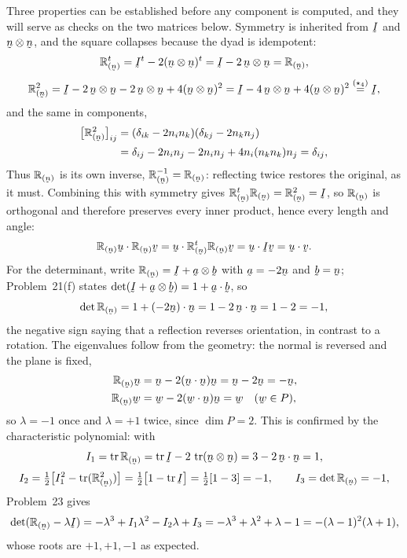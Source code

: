 \begin{solution}
Three properties can be established before any component is computed, and
they will serve as checks on the two matrices below. Symmetry is inherited
from $\I$ and $\bn\otimes\bn$, and the square collapses because the dyad is
idempotent:
\[
   \Refl{\bn}^{t}=\I^{t}-2(\bn\otimes\bn)^{t}=\I-2\,\bn\otimes\bn
   =\Refl{\bn},
\]
\[
   \Refl{\bn}^{2}=\I-2\,\bn\otimes\bn-2\,\bn\otimes\bn
   +4(\bn\otimes\bn)^{2}
   =\I-4\,\bn\otimes\bn+4(\bn\otimes\bn)^{2}
   \overset{(\star_4)}{=}\I,
\]
and the same in components,
\[
\begin{aligned}
   \big[\Refl{\bn}^{2}\big]_{ij}&=(\dd_{ik}-2n_in_k)(\dd_{kj}-2n_kn_j)\\
   &=\dd_{ij}-2n_in_j-2n_in_j+4n_i(n_kn_k)n_j=\dd_{ij},
\end{aligned}
\]
Thus $\Refl{\bn}$ is its own inverse, $\Refl{\bn}^{-1}=\Refl{\bn}$:
reflecting twice restores the original, as it must. Combining this with
symmetry gives $\Refl{\bn}^{t}\Refl{\bn}=\Refl{\bn}^{2}=\I$, so
$\Refl{\bn}$ is orthogonal and therefore preserves every inner product,
hence every length and angle:
\[
   \ip{\Refl{\bn}\bu}{\Refl{\bn}\bv}
   =\ip\bu{\Refl{\bn}^{t}\Refl{\bn}\bv}=\ip\bu{\I\bv}=\ip\bu\bv .
\]
For the determinant, write $\Refl{\bn}=\I+\ba\otimes\bb$ with $\ba=-2\bn$
and $\bb=\bn$; Problem~21(f) states $\det(\I+\ba\otimes\bb)=1+\ip\ba\bb$, so
\[
   \det\Refl{\bn}=1+\ip{(-2\bn)}{\bn}=1-2\,\ip\bn\bn=1-2=-1 ,
\]
the negative sign saying that a reflection reverses orientation, in contrast
to a rotation. The eigenvalues follow from the geometry: the normal is
reversed and the plane is fixed,
\[
\begin{aligned}
   \Refl{\bn}\bn&=\bn-2(\ip\bn\bn)\bn=\bn-2\bn=-\bn,\\
   \Refl{\bn}\bw&=\bw-2(\ip\bw\bn)\bn=\bw \quad (\bw\in P),
\end{aligned}
\]
so $\lambda=-1$ once and $\lambda=+1$ twice, since $\dim P=2$. This is
confirmed by the characteristic polynomial: with
\[
   I_1=\tr\Refl{\bn}=\tr\I-2\,\tr(\bn\otimes\bn)=3-2\,\ip\bn\bn=1,
\]
\[
   I_2=\tfrac12\big[I_1^{2}-\tr(\Refl{\bn}^{2})\big]
   =\tfrac12\big[1-\tr\I\big]=\tfrac12[1-3]=-1,
   \qquad I_3=\det\Refl{\bn}=-1,
\]
Problem~23 gives
\[
   \det(\Refl{\bn}-\lambda\I)=-\lambda^{3}+I_1\lambda^{2}-I_2\lambda+I_3
   =-\lambda^{3}+\lambda^{2}+\lambda-1
   =-(\lambda-1)^{2}(\lambda+1),
\]
whose roots are $+1,+1,-1$ as expected.


\end{solution}
